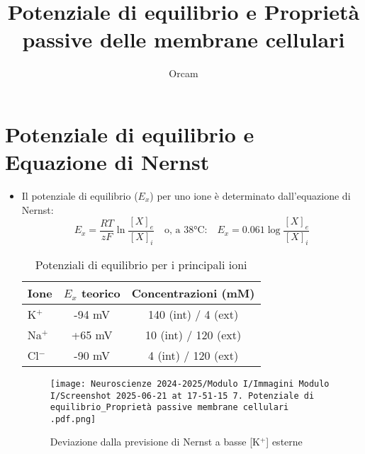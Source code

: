 \documentclass{article}
\title{Potenziale di equilibrio e Proprietà passive delle membrane cellulari}
\author{Orcam}
\date{}
\begin{document}
\maketitle

\section{Potenziale di equilibrio e Equazione di Nernst}
\begin{itemize}
\item Il potenziale di equilibrio (\(E_x\)) per uno ione è determinato dall'equazione di Nernst:
\[
E_x = \frac{RT}{zF} \ln \frac{[X]_e}{[X]_i} \quad \text{o, a 38°C:} \quad E_x = 0.061 \log \frac{[X]_e}{[X]_i}
\]
\begin{table}[h]
\centering
\begin{tabular}{lcc}
\toprule
Ione & \(E_x\) teorico & Concentrazioni (mM) \\
\midrule
K\(^+\) & -94 mV & 140 (int) / 4 (ext) \\
Na\(^+\) & +65 mV & 10 (int) / 120 (ext) \\
Cl\(^-\) & -90 mV & 4 (int) / 120 (ext) \\
\bottomrule
\end{tabular}
\caption{Potenziali di equilibrio per i principali ioni}
\end{table}

\begin{figure}[h]
\centering
\texttt{[image: Neuroscienze 2024-2025/Modulo I/Immagini Modulo I/Screenshot 2025-06-21 at 17-51-15 7. Potenziale di equilibrio\_Proprietà passive membrane cellulari .pdf.png]}
\caption{Deviazione dalla previsione di Nernst a basse [K\(^+\)] esterne}
\label{fig:nernst}
\end{figure}
\end{itemize}

\end{document}
